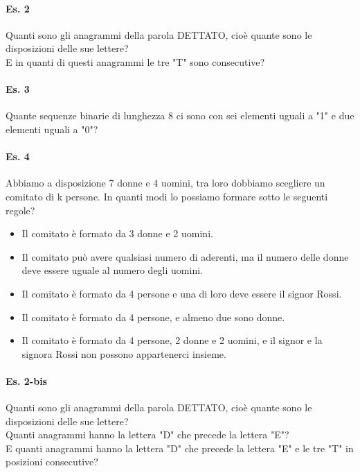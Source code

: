 \paragraph{Es. 2} Quanti sono gli anagrammi della parola DETTATO, cioè quante sono le disposizioni delle sue lettere? \\ 
E in quanti di questi anagrammi le tre "T" sono consecutive?

\paragraph{Es. 3} Quante sequenze binarie di lunghezza 8 ci sono con sei elementi uguali a "1" e due elementi uguali a "0"?

\paragraph{Es. 4} Abbiamo a disposizione 7 donne e 4 uomini, tra loro dobbiamo scegliere un comitato di k persone. 
In quanti modi lo possiamo formare sotto le seguenti regole? 
\begin{itemize}
    \item Il comitato è formato da 3 donne e 2 uomini.
    \item Il comitato può avere qualsiasi numero di aderenti, ma il
    numero delle donne deve essere uguale al numero degli
    uomini.
    \item Il comitato è formato da 4 persone e una di loro deve essere il signor Rossi.
    \item Il comitato è formato da 4 persone, e almeno due sono donne.
    \item Il comitato è formato da 4 persone, 2 donne e 2 uomini, e il signor e la signora Rossi
    non possono appartenerci insieme.
\end{itemize}

\paragraph{Es. 2-bis}
Quanti sono gli anagrammi della parola DETTATO, cioè quante sono le disposizioni delle sue lettere? \\ 
Quanti anagrammi hanno la lettera "D" che precede la lettera "E"? \\ 
E quanti anagrammi hanno la lettera "D" che precede la lettera "E" e le tre "T" in posizioni consecutive?



\newpage
